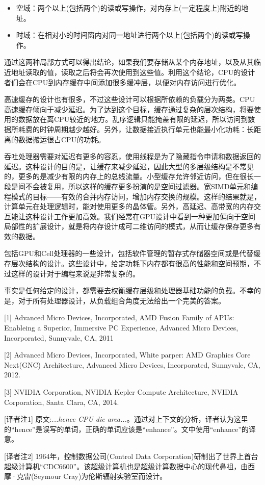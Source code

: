 \begin{itemize}
\item 空域：两个以上(包括两个)的读或写操作，对内存上(一定程度上)附近的地址。
\item 时域：在相对小的时间窗内对同一地址进行两个以上(包括两个)的读或写操作。
\end{itemize}

通过这两种局部方式可以得出结论，如果我们要存储从某个内存地址，以及从其临近地址读取的值，读取之后将会再次使用到这些值。利用这个结论，CPU的设计者们会在CPU到内存缓存中间添加很多缓冲层，以便对内存访问进行优化。

高速缓存的设计也有很多，不过这些设计可以根据所依赖的负载分为两类。CPU高速缓存倾向于减少延迟。为了达到这个目标，缓存通过复杂的层次结构，将要使用的数据放在离CPU较近的地方。乱序逻辑只能掩盖有限的延迟，所以访问到数据所耗费的时钟周期越少越好。另外，让数据接近执行单元也能最小化功耗：长距离的数据搬运很占CPU的功耗。

吞吐处理器需要对延迟有更多的容忍，使用线程是为了隐藏指令申请和数据返回的延迟。这种设计的目的是，让缓存来减少延迟，因此大型的多层级结构是不常见的，更多的是减少有限的内存上的总线流量。小型缓存允许邻近访问，但在很长一段是间不会被复用，所以这样的缓存更多扮演的是空间过滤器。宽SIMD单元和编程模式的目标——有效的合并内存访问，增加内存交换的规模。这样的结果就是，计算单元在处理逻辑时，能对使用更多的晶体管。另外，高延迟、高带宽的内存交互能让这种设计工作更加高效。我们经常在GPU设计中看到一种更加偏向于空间局部性的扩展设计，就是将内存设计成可二维访问的模式，从而让缓存保存更多有效的数据。

包括GPU和Cell处理器的一些设计，包括软件管理的暂存式存储器空间或是代替缓存层次结构的设计。这些设计中，给定功耗下内存都有很高的性能和空间预期，不过这样的设计对于编程来说是非常复杂的。

事实是任何给定的设计，都需要去权衡缓存层级和处理器基础功能的负载。不幸的是，对于所有处理器设计，从负载组合角度无法给出一个完美的答案。

\myRefRule

\begin{myRefs}

[1] Advanced Micro Devices, Incorporated, AMD Fusion Family of APUs: Enableing a Superior, Immersive PC Experience, Advanced Micro Devices, Incorporated, Sunnyvale, CA, 2011

[2] Advanced Micro Devices, Incorporated, White parper: AMD Graphics Core Next(GNC) Architecture, Advanced Micro Devices, Incorporated, Sunnyvale, CA, 2012.

[3] NVIDIA Corporation, NVIDIA Kepler Compute Architecture, NVIDIA Corporation, Santa Clara, CA, 2014.

[译者注1] 原文:\emph{...hence CPU die area...}。通过对上下文的分析，译者认为这里的“hence”是误写的单词，正确的单词应该是“enhance”。文中使用“enhance”的译意。

[译者注2] 1964年，控制数据公司(Control Data Corporation)研制出了世界上首台超级计算机“CDC6600”。该超级计算机也是超级计算数据中心的现代鼻祖，由西摩·克雷(Seymour Cray)为伦斯辐射实验室而设计。

\end{myRefs}



